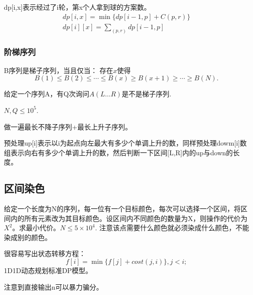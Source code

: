 \documentclass{article}
\begin{document}
dp[i,x]表示经过了i轮，第x个人拿到球的方案数。
\begin{equation*}
    \begin{aligned}
        dp[i,x]=\min\{dp[i-1,p]+C(p,r)\}\\
        dp[i][x]=\sum_{(p,r)} dp[i-1,p]
    \end{aligned}
\end{equation*}
\subsubsection{阶梯序列}
B序列是梯子序列，当且仅当：
存在$x$使得
\begin{equation*}
    B(1)\le B(2)\le\cdots\le B(x)\ge B(x+1)\ge\cdots\ge B(N).
\end{equation*}

给定一个序列A，有Q次询问$A(L\ldots R)$是不是梯子序列.

$N,Q\le 10^5$.

做一遍最长不降子序列+最长上升子序列。

预处理up[i]表示以i为起点向左最大有多少个单调上升的数，同样预处理dowm[i]数组表示向右有多少个单调上升的数，然后判断一下区间[L,R]内的up与down的长度。

\subsection{区间染色}
给定一个长度为N的序列，每一位有一个目标颜色，每次可以选择一个区间，将区间内的所有元素改为其目标颜色。设区间内不同颜色的数量为X，则操作的代价为$X^2$。求最小代价。$N\le 5\times 10^4.$ 注意该点需要什么颜色就必须染成什么颜色，不能染成别的颜色。

很容易写出状态转移方程：
\begin{equation*}
    f[i]=\min\{f[j]+cost(j,i)\},j<i;
\end{equation*}
1D1D动态规划标准DP模型。

注意到直接输出n可以暴力骗分。
\end{document}
